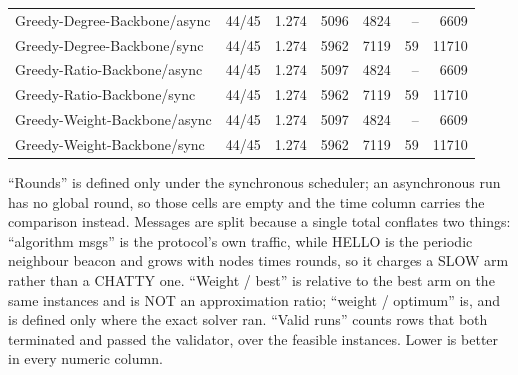 \begin{table}[tb]
\begin{tabular}{lrrrrrr}
Greedy-Degree-Backbone/async & 44/45 & 1.274 & 5096 & 4824 & -- & 6609 \\
Greedy-Degree-Backbone/sync & 44/45 & 1.274 & 5962 & 7119 & 59 & 11710 \\
Greedy-Ratio-Backbone/async & 44/45 & 1.274 & 5097 & 4824 & -- & 6609 \\
Greedy-Ratio-Backbone/sync & 44/45 & 1.274 & 5962 & 7119 & 59 & 11710 \\
Greedy-Weight-Backbone/async & 44/45 & 1.274 & 5097 & 4824 & -- & 6609 \\
Greedy-Weight-Backbone/sync & 44/45 & 1.274 & 5962 & 7119 & 59 & 11710 \\
\bottomrule
\end{tabular}
\begin{flushleft}\footnotesize
``Rounds'' is defined only under the synchronous scheduler; an asynchronous run has no global round, so those cells are empty and the time column carries the comparison instead. Messages are split because a single total conflates two things: ``algorithm msgs'' is the protocol's own traffic, while HELLO is the periodic neighbour beacon and grows with nodes times rounds, so it charges a SLOW arm rather than a CHATTY one. ``Weight / best'' is relative to the best arm on the same instances and is NOT an approximation ratio; ``weight / optimum'' is, and is defined only where the exact solver ran. ``Valid runs'' counts rows that both terminated and passed the validator, over the feasible instances. Lower is better in every numeric column.
\end{flushleft}
\end{table}
